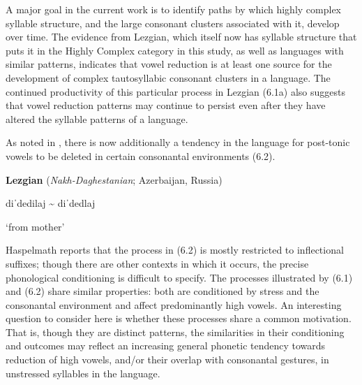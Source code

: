  A major goal in the current work is to identify paths by which highly complex syllable structure, and the large consonant clusters associated with it, develop over time. The evidence from Lezgian, which itself now has syllable structure that puts it in the Highly Complex category in this study, as well as languages with similar patterns, indicates that vowel reduction is at least one source for the development of complex tautosyllabic consonant clusters in a language. The continued productivity of this particular process in Lezgian (6.1a) also suggests that vowel reduction patterns may continue to persist even after they have altered the syllable patterns of a language. 



  As noted in , there is now additionally a tendency in the language for post-tonic vowels to be deleted in certain consonantal environments (6.2).



\ea\label{ex:(6.2)}
  \textbf{Lezgian} (\textit{Nakh-Daghestanian}; Azerbaijan, Russia)



diˈdedilaj {\textasciitilde} diˈdedlaj



‘from mother’



\citep[40]{Haspelmath1993}

\z


Haspelmath reports that the process in (6.2) is mostly restricted to inflectional suffixes; though there are other contexts in which it occurs, the precise phonological conditioning is difficult to specify. The processes illustrated by (6.1) and (6.2) share similar properties: both are conditioned by stress and the consonantal environment and affect predominantly high vowels. An interesting question to consider here is whether these processes share a common motivation. That is, though they are distinct patterns, the similarities in their conditioning and outcomes may reflect an increasing general phonetic tendency towards reduction of high vowels, and/or their overlap with consonantal gestures, in unstressed syllables in the language.




